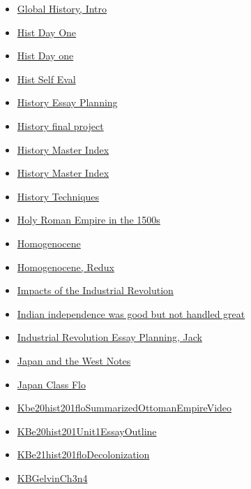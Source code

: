 \documentclass[11pt]{article}
\begin{document}
\begin{itemize}
\begin{itemize}
\begin{itemize}
\item \href{history/history10/KBhHIST201GHIntro.org}{Global History, Intro}
\item \href{history/history10/KBxDayOne.org}{Hist Day One}
\item \href{history/history10/KB20200824141300.org}{Hist Day one}
\item \href{history/history10/KBxHistSelfEval2020.org}{Hist Self Eval}
\item \href{history/history10/KBhHIST201WWIEssayOutlineJack.org}{History Essay Planning}
\item \href{history/history10/KBe21hist201retFinalProject.org}{History final project}
\item \href{history/history10/index.org}{History Master Index}
\item \href{history/history10/KBHistoryMasterIndex.org}{History Master Index}
\item \href{history/history10/20hist201refTechniques.org}{History Techniques}
\item \href{history/history10/KBhHIST201HolyRomanEmpire1500s.org}{Holy Roman Empire in the 1500s}
\item \href{history/history10/KBhHIST201HomogenosceneLN.org}{Homogenocene}
\item \href{history/history10/KBhHIST201HomogenosceneRedux.org}{Homogenocene, Redux}
\item \href{history/history10/KBhHIST201ImpactsofIR.org}{Impacts of the Industrial Revolution}
\item \href{history/history10/KBe21hist201floBittersweetIndianIndependence.org}{Indian independence was good but not handled great}
\item \href{history/history10/KBhHIST201Unit3EssayJack.org}{Industrial Revolution Essay Planning, Jack}
\item \href{history/history10/KBxJapanandtheWest.org}{Japan and the West Notes}
\item \href{history/history10/KBhHIST201JapanClassFlo.org}{Japan Class Flo}
\item \href{history/history10/Kbe20hist201floSummarizedOttomanEmpireVideo.org}{Kbe20hist201floSummarizedOttomanEmpireVideo}
\item \href{history/history10/KBe20hist201Unit1EssayOutline.org}{KBe20hist201Unit1EssayOutline}
\item \href{history/history10/KBe21hist201floDecolonization.org}{KBe21hist201floDecolonization}
\item \href{history/history10/KBGelvinCh3n4.org}{KBGelvinCh3n4}

\end{itemize}
\end{itemize}
\end{itemize}
\end{document}
